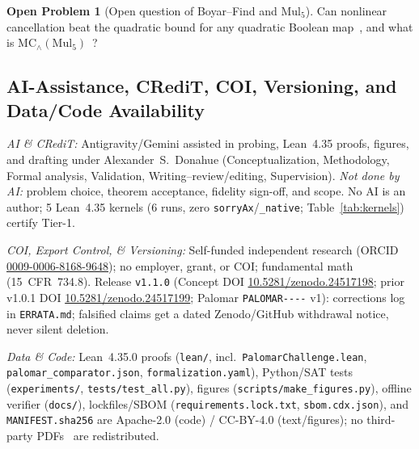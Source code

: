 \documentclass[11pt,reqno]{amsart}
\theoremstyle{definition}
\newtheorem{openproblem}[theorem]{Open Problem}
\newcommand{\MC}{\mathrm{MC}_\wedge}
\begin{document}
\begin{openproblem}[Open question of Boyar--Find and $\mathrm{Mul}_5$]
Can nonlinear cancellation beat the quadratic bound for any quadratic Boolean map~\cite{BoyarFind2018}, and what is $\MC(\mathrm{Mul}_5)$~\cite{Morse2026}?
\end{openproblem}

\subsection*{AI-Assistance, CRediT, COI, Versioning, and Data/Code Availability}
\emph{AI \& CRediT:} Antigravity/Gemini assisted in probing, Lean~4.35 proofs, figures, and drafting under Alexander~S.\ Donahue (Conceptualization, Methodology, Formal analysis, Validation, Writing--review/editing, Supervision).
\emph{Not done by AI:} problem choice, theorem acceptance, fidelity sign-off, and scope.
No AI is an author; 5 Lean~4.35 kernels (6 runs, zero \texttt{sorryAx}/\texttt{\_native}; Table~\ref{tab:kernels}) certify Tier-1.

\emph{COI, Export Control, \& Versioning:} Self-funded independent research (ORCID \href{https://orcid.org/0009-0006-8168-9648}{0009-0006-8168-9648}); no employer, grant, or COI; fundamental math (15~CFR~734.8).
Release \texttt{v1.1.0} (Concept DOI \href{https://doi.org/10.5281/zenodo.24517198}{10.5281/zenodo.24517198}; prior v1.0.1 DOI \href{https://doi.org/10.5281/zenodo.24517199}{10.5281/zenodo.24517199}; Palomar \texttt{PALOMAR----} v1): corrections log in \texttt{ERRATA.md}; falsified claims get a dated Zenodo/GitHub withdrawal notice, never silent deletion.

\emph{Data \& Code:} Lean~4.35.0 proofs (\texttt{lean/}, incl.\ \texttt{Palomar\allowbreak Challenge.\allowbreak lean}, \texttt{palomar\_\allowbreak comparator.\allowbreak json}, \texttt{formalization.\allowbreak yaml}), Python/SAT tests (\texttt{experiments/}, \texttt{tests/\allowbreak test\_\allowbreak all.\allowbreak py}), figures (\texttt{scripts/\allowbreak make\_\allowbreak figures.\allowbreak py}), offline verifier (\texttt{docs/}), lockfiles/SBOM (\texttt{requirements.\allowbreak lock.\allowbreak txt}, \texttt{sbom.\allowbreak cdx.\allowbreak json}), and \texttt{MANIFEST.\allowbreak sha256} are Apache-2.0 (code) / CC-BY-4.0 (text/figures); no third-party PDFs~\cite{Vinciguerra2026,Morse2026} are redistributed.



\end{document}
